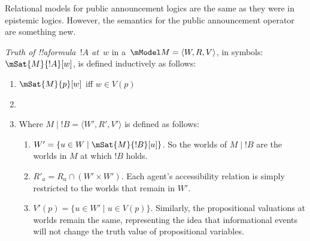 \documentclass[../../../include/open-logic-section]{subfiles}
\begin{document}


Relational models for public announcement logics are the same as they were in epistemic logics. However,
the semantics for the public announcement operator are something new.

\begin{defn}
  \emph{Truth of !!a{formula}~$!A$ at~$w$} in a~$\mModel M = \langle W, R, V \rangle$, in symbols:
  $\mSat{M}{!A}[w]$, is defined inductively as follows:
  \begin{enumerate}
  \item $\mSat{M}{p}[w]$ iff $w \in V(p)$
  \item{}
  \item{}

  
  Where $M \mid !B = \langle W', R', V' \rangle$ is defined as follows:
  
  \begin{enumerate}
  \item $W' = \{ u \in W \mid \mSat{M}{!B}[u] \}$. 
  So the worlds of $M \mid !B$ are the worlds in $M$ at which $!B$ holds.
  \item $R'_a = R_a \cap (W' \times W')$.
  Each agent's accessibility relation is simply restricted to the worlds that remain in $W'$.
  \item $V'(p) = \{ u \in W' \mid u \in V(p) \}$.
  Similarly, the propositional valuations at worlds remain the same, representing the idea that informational events
  will not change the truth value of propositional variables.
  \end{enumerate}
  
  \end{enumerate} 
\end{defn}
\end{document}

